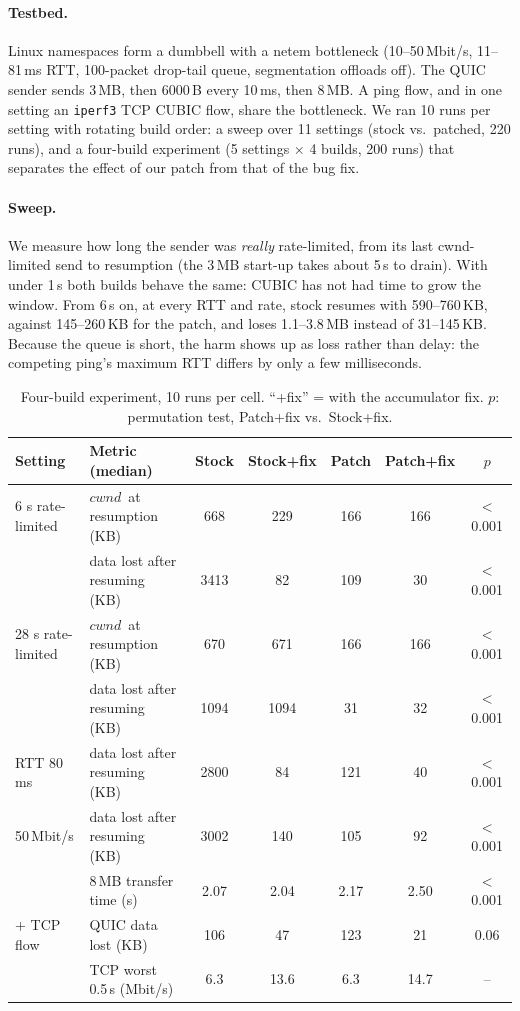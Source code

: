 \documentclass[11pt,a4paper]{article}
\newcommand{\cwnd}{\ensuremath{\mathit{cwnd}}}
\begin{document}
\paragraph{Testbed.} Linux namespaces form a dumbbell with a netem bottleneck
(10--50\,Mbit/s, 11--81\,ms RTT, 100-packet drop-tail queue, segmentation
offloads off). The QUIC sender sends 3\,MB, then 6000\,B every 10\,ms, then
8\,MB. A ping flow, and in one setting an \texttt{iperf3} TCP CUBIC flow,
share the bottleneck. We ran 10 runs per setting with rotating build order: a
sweep over 11 settings (stock vs.\ patched, 220 runs), and a four-build
experiment (5 settings $\times$ 4 builds, 200 runs) that separates the effect of
our patch from that of the bug fix.

\paragraph{Sweep.} We measure how long the sender was \emph{really}
rate-limited, from its last cwnd-limited send to resumption (the 3\,MB start-up
takes about 5\,s to drain). With under 1\,s both builds behave the same: CUBIC
has not had time to grow the window. From 6\,s on,
at every RTT and rate, stock resumes with 590--760\,KB, against
145--260\,KB for the patch, and loses 1.1--3.8\,MB instead of 31--145\,KB.
Because the queue is short, the harm shows up as loss rather than delay: the
competing ping's maximum RTT differs by only a few milliseconds.

\begin{table}[tbp]
\centering\small
\setlength{\tabcolsep}{5pt}
\begin{tabular}{@{}llccccc@{}}
\toprule
Setting & Metric (median) & Stock & Stock+fix & Patch & Patch+fix & $p$ \\
\midrule
6 s rate-limited & \cwnd\ at resumption (KB) & 668 & 229 & 166 & 166 & $<$0.001 \\
 & data lost after resuming (KB) & 3413 & 82 & 109 & 30 & $<$0.001 \\
28 s rate-limited & \cwnd\ at resumption (KB) & 670 & 671 & 166 & 166 & $<$0.001 \\
 & data lost after resuming (KB) & 1094 & 1094 & 31 & 32 & $<$0.001 \\
RTT 80\,ms & data lost after resuming (KB) & 2800 & 84 & 121 & 40 & $<$0.001 \\
50\,Mbit/s & data lost after resuming (KB) & 3002 & 140 & 105 & 92 & $<$0.001 \\
 & 8\,MB transfer time (s) & 2.07 & 2.04 & 2.17 & 2.50 & $<$0.001 \\
+ TCP flow & QUIC data lost (KB) & 106 & 47 & 123 & 21 & 0.06 \\
 & TCP worst 0.5\,s (Mbit/s) & 6.3 & 13.6 & 6.3 & 14.7 & -- \\
\bottomrule
\end{tabular}
\caption{Four-build experiment, 10 runs per cell. ``+fix'' = with the
  accumulator fix. $p$: permutation test, Patch+fix vs.\ Stock+fix.}
\label{tab:four}
\end{table}
\end{document}

